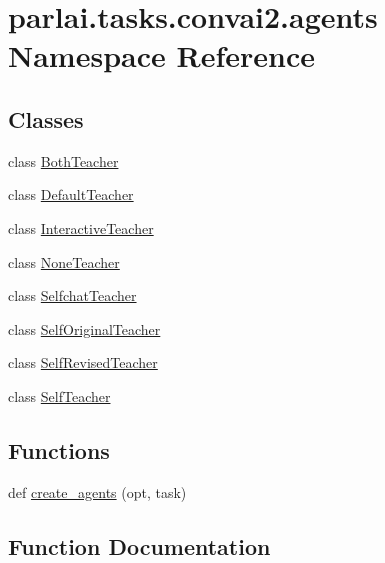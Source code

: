 \hypertarget{namespaceparlai_1_1tasks_1_1convai2_1_1agents}{}\section{parlai.\+tasks.\+convai2.\+agents Namespace Reference}
\label{namespaceparlai_1_1tasks_1_1convai2_1_1agents}
\subsection*{Classes}
\begin{DoxyCompactItemize}
\item 
class \hyperlink{classparlai_1_1tasks_1_1convai2_1_1agents_1_1BothTeacher}{Both\+Teacher}
\item 
class \hyperlink{classparlai_1_1tasks_1_1convai2_1_1agents_1_1DefaultTeacher}{Default\+Teacher}
\item 
class \hyperlink{classparlai_1_1tasks_1_1convai2_1_1agents_1_1InteractiveTeacher}{Interactive\+Teacher}
\item 
class \hyperlink{classparlai_1_1tasks_1_1convai2_1_1agents_1_1NoneTeacher}{None\+Teacher}
\item 
class \hyperlink{classparlai_1_1tasks_1_1convai2_1_1agents_1_1SelfchatTeacher}{Selfchat\+Teacher}
\item 
class \hyperlink{classparlai_1_1tasks_1_1convai2_1_1agents_1_1SelfOriginalTeacher}{Self\+Original\+Teacher}
\item 
class \hyperlink{classparlai_1_1tasks_1_1convai2_1_1agents_1_1SelfRevisedTeacher}{Self\+Revised\+Teacher}
\item 
class \hyperlink{classparlai_1_1tasks_1_1convai2_1_1agents_1_1SelfTeacher}{Self\+Teacher}
\end{DoxyCompactItemize}
\subsection*{Functions}
\begin{DoxyCompactItemize}
\item 
def \hyperlink{namespaceparlai_1_1tasks_1_1convai2_1_1agents_a0c9209b5a7c832ac11a43d91ee7929f0}{create\+\_\+agents} (opt, task)
\end{DoxyCompactItemize}


\subsection{Function Documentation}
\mbox{\label{namespaceparlai_1_1tasks_1_1convai2_1_1agents_a0c9209b5a7c832ac11a43d91ee7929f0}} 
